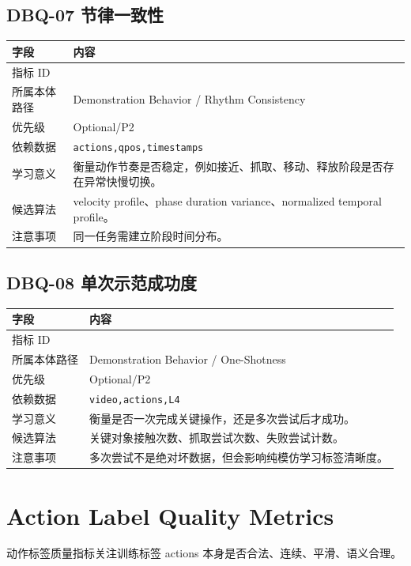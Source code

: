 \documentclass[UTF8,zihao=-4,oneside,openany]{ctexrep}
\newcommand{\Code}[1]{\texttt{#1}}
\newcommand{\MID}[1]{\texttt{\seqsplit{#1}}}
\begin{document}
\subsection{DBQ-07 节律一致性}

\begin{longtable}{L{3.6cm} L{9.6cm}}
\toprule
字段 & 内容 \\
\midrule
指标 ID & \MID{DBQ-07} \\
所属本体路径 & Demonstration Behavior / Rhythm Consistency \\
优先级 & Optional/P2 \\
依赖数据 & \Code{actions,qpos,timestamps} \\
学习意义 & 衡量动作节奏是否稳定，例如接近、抓取、移动、释放阶段是否存在异常快慢切换。 \\
候选算法 & velocity profile、phase duration variance、normalized temporal profile。 \\
注意事项 & 同一任务需建立阶段时间分布。 \\
\bottomrule
\end{longtable}

\subsection{DBQ-08 单次示范成功度}

\begin{longtable}{L{3.6cm} L{9.6cm}}
\toprule
字段 & 内容 \\
\midrule
指标 ID & \MID{DBQ-08} \\
所属本体路径 & Demonstration Behavior / One-Shotness \\
优先级 & Optional/P2 \\
依赖数据 & \Code{video,actions,L4} \\
学习意义 & 衡量是否一次完成关键操作，还是多次尝试后才成功。 \\
候选算法 & 关键对象接触次数、抓取尝试次数、失败尝试计数。 \\
注意事项 & 多次尝试不是绝对坏数据，但会影响纯模仿学习标签清晰度。 \\
\bottomrule
\end{longtable}

\section{Action Label Quality Metrics}

动作标签质量指标关注训练标签 actions 本身是否合法、连续、平滑、语义合理。
\end{document}
